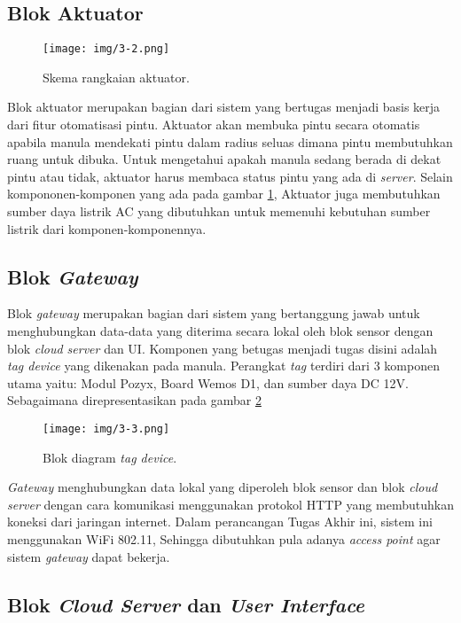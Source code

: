 \subsection{Blok Aktuator}
\vspace{1ex}
\begin{figure} [!htb]
	\captionsetup{justification=centering}
	\texttt{[image: img/3-2.png]}
	\caption{Skema rangkaian aktuator.}
	\label{fig:3_2}
\end{figure}
Blok aktuator merupakan bagian dari sistem yang bertugas menjadi basis kerja dari fitur otomatisasi pintu. Aktuator akan membuka pintu secara otomatis apabila manula mendekati pintu dalam radius seluas dimana pintu membutuhkan ruang untuk dibuka. Untuk mengetahui apakah manula sedang berada di dekat pintu atau tidak, aktuator harus membaca status pintu yang ada di \textit{server}. Selain kompononen-komponen yang ada pada gambar \ref{fig:3_2}, Aktuator juga membutuhkan sumber daya listrik AC yang dibutuhkan untuk memenuhi kebutuhan sumber listrik dari komponen-komponennya.
\subsection{Blok \textit{Gateway}}
\vspace{1ex}
Blok \textit{gateway} merupakan bagian dari sistem yang bertanggung jawab untuk menghubungkan data-data yang diterima secara lokal oleh blok sensor dengan blok\textit{ cloud server} dan UI. Komponen yang betugas menjadi tugas disini adalah \textit{tag device} yang dikenakan pada manula. Perangkat \textit{tag} terdiri dari 3 komponen utama yaitu: Modul Pozyx, Board Wemos D1, dan sumber daya DC 12V. Sebagaimana direpresentasikan pada gambar \ref{fig:3_3}
\begin{figure} [!htb]
	\captionsetup{justification=centering}
	\texttt{[image: img/3-3.png]}
	\caption{Blok diagram \textit{tag device}.}
	\label{fig:3_3}
\end{figure}
\textit{Gateway} menghubungkan data lokal yang diperoleh blok sensor dan blok \textit{cloud server} dengan cara komunikasi menggunakan protokol HTTP yang membutuhkan koneksi dari jaringan internet. Dalam perancangan Tugas Akhir ini, sistem ini menggunakan WiFi 802.11, Sehingga dibutuhkan pula adanya \textit{access point} agar sistem \textit{gateway} dapat bekerja.
\subsection{Blok \textit{Cloud Server} dan \textit{User Interface}}

